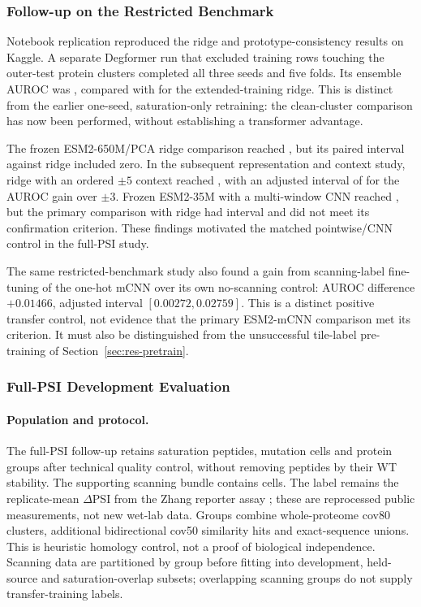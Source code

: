 \subsubsection{Follow-up on the Restricted Benchmark}
Notebook replication reproduced the ridge and prototype-consistency results on Kaggle. A separate
Degformer run that excluded training rows touching the outer-test protein clusters completed all
three seeds and five folds. Its ensemble AUROC was \nRoneAuc{}, compared with \nAucRidgeExt{} for
the extended-training ridge. This is distinct from the earlier one-seed, saturation-only retraining:
the clean-cluster comparison has now been performed, without establishing a transformer advantage.

The frozen ESM2-650M/PCA ridge comparison reached \nRtwoAuc{}, but its paired interval against
ridge included zero. In the subsequent representation and context study, ridge with an ordered
$\pm5$ context reached \nRsixWfive{}, with an adjusted interval of \nRsixWfiveCI{} for the AUROC
gain over $\pm3$. Frozen ESM2-35M with a multi-window CNN reached \nRsixMcnn{}, but the primary
comparison with ridge had interval \nRsixPrimaryCI{} and did not meet its confirmation criterion.
These findings motivated the matched pointwise/CNN control in the full-PSI study.

The same restricted-benchmark study also found a gain from scanning-label fine-tuning of the
one-hot mCNN over its own no-scanning control: AUROC difference $+0.01466$, adjusted interval
$[0.00272,0.02759]$. This is a distinct positive transfer control, not evidence that the primary
ESM2-mCNN comparison met its criterion. It must also be distinguished from the unsuccessful
tile-label pre-training of Section~\ref{sec:res-pretrain}.

\subsubsection{Full-PSI Development Evaluation}\label{sec:res-fullpsi}
\paragraph{Population and protocol.}
The full-PSI follow-up retains \nVthreeNPeptides{} saturation peptides, \nVthreeNCells{} mutation
cells and \nVthreeNGroups{} protein groups after technical quality control, without removing
peptides by their WT stability. The supporting scanning bundle contains \nVthreeNScanCells{} cells.
The label remains the replicate-mean $\Delta$PSI from the Zhang reporter assay
\citep{zhang2023,zhang2023data}; these are reprocessed public measurements, not new wet-lab data.
Groups combine whole-proteome cov80 clusters, additional bidirectional cov50 similarity hits and
exact-sequence unions. This is heuristic homology control, not a proof of biological independence.
Scanning data are partitioned by group before fitting into development, held-source and
saturation-overlap subsets; overlapping scanning groups do not supply transfer-training labels.

